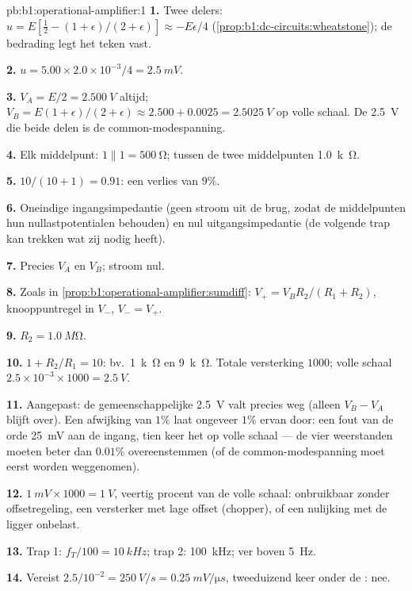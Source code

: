 \begin{solution}{pb:b1:operational-amplifier:1}
\textbf{1.} Twee delers: $u = E[\tfrac12 - (1 + \epsilon)/(2 + \epsilon)]
\approx -E\epsilon/4$ (\cref{prop:b1:dc-circuits:wheatstone}); de bedrading
legt het teken vast.

\textbf{2.} $u = 5.00 \times 2.0\times10^{-3}/4 = \qty{2.5}{mV}$.

\textbf{3.} $V_A = E/2 = \qty{2.500}{V}$ altijd; $V_B = E(1 + \epsilon)/(2 +
\epsilon) \approx 2.500 + 0.0025 = \qty{2.5025}{V}$ op volle schaal. De
\qty{2.5}{V} die beide delen is de common-modespanning.

\textbf{4.} Elk middelpunt: $1 \parallel 1 = \qty{500}{\ohm}$; tussen de
twee middelpunten \qty{1.0}{k\ohm}.

\textbf{5.} $10/(10 + 1) = 0.91$: een verlies van $9\%$.

\textbf{6.} Oneindige ingangsimpedantie (geen stroom uit de brug, zodat
de middelpunten hun nullastpotentialen behouden) en nul
uitgangsimpedantie (de volgende trap kan trekken wat zij nodig heeft).

\textbf{7.} Precies $V_A$ en $V_B$; stroom nul.

\textbf{8.} Zoals in \cref{prop:b1:operational-amplifier:sumdiff}: $V_+ =
V_BR_2/(R_1 + R_2)$, knooppuntregel in $V_-$, $V_- = V_+$.

\textbf{9.} $R_2 = \qty{1.0}{M\ohm}$.

\textbf{10.} $1 + R_2/R_1 = 10$: bv.\ \qty{1}{k\ohm} en \qty{9}{k\ohm}.
Totale versterking $1000$; volle schaal $2.5 \times 10^{-3} \times 1000 = \qty{2.5}{V}$.

\textbf{11.} Aangepast: de gemeenschappelijke \qty{2.5}{V} valt precies weg (alleen
$V_B - V_A$ blijft over). Een afwijking van $1\%$ laat ongeveer $1\%$ ervan door: een
fout van de orde \qty{25}{mV} aan de ingang, tien keer het  op volle
schaal --- de vier weerstanden moeten beter dan $0.01\%$ overeenstemmen
(of de common-modespanning moet eerst worden weggenomen).

\textbf{12.} $1\ \unit{mV} \times 1000 = \qty{1}{V}$, veertig procent van de volle
schaal: onbruikbaar zonder offsetregeling, een versterker met lage offset
(chopper), of een nulijking met de ligger onbelast.

\textbf{13.} Trap 1: $f_T/100 = \qty{10}{kHz}$; trap 2: \qty{100}{kHz};
ver boven \qty{5}{Hz}.

\textbf{14.} Vereist $2.5/10^{-2} = \qty{250}{V/s} = \qty{0.25}{mV/\micro s}$,
tweeduizend keer onder de : nee.


\end{solution}
